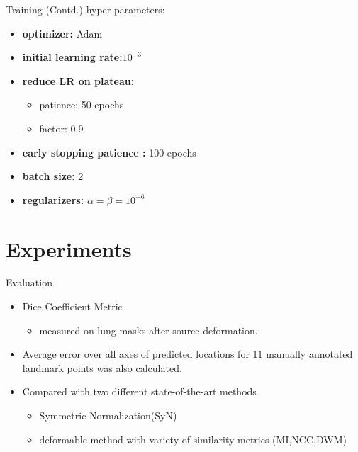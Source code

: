 \documentclass{beamer}
\begin{document}
\begin{frame}{Training (Contd.)}
    hyper-parameters:
        \begin{itemize}
            \item \textbf{optimizer:} Adam 
            \item \textbf{initial learning rate:}$10^{-3}$
            \item \textbf{reduce LR on plateau:} 
                \begin{itemize}
                    \item patience: 50 epochs
                    \item factor: 0.9
                \end{itemize}
            \item \textbf{early stopping patience :} 100 epochs
            \item \textbf{batch size:} 2
            \item \textbf{regularizers:} $\alpha = \beta = 10^{-6}$
        \end{itemize}
\end{frame}

\section{Experiments}
\begin{frame}{Evaluation}
    \begin{itemize}
        \item Dice Coefficient Metric
        \begin{itemize}
            \item measured on lung masks after source deformation.
        \end{itemize}
        \item Average error over all axes of predicted locations for 11 manually annotated landmark points was also calculated.
        \item Compared with two different state-of-the-art methods
            \begin{itemize}
                \item Symmetric Normalization(SyN)
                \item deformable method with variety of similarity metrics (MI,NCC,DWM)
            \end{itemize}
    \end{itemize}
\end{frame}
\end{document}
